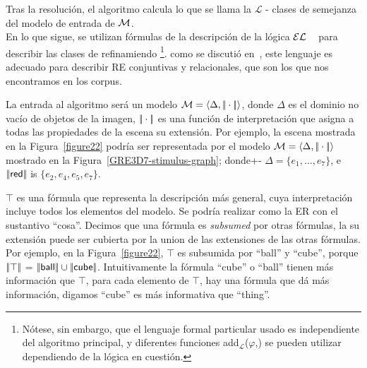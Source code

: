 

Tras la resoluci\'on, el algoritmo calcula lo que se llama la
$\mathcal{L}$ - clases de semejanza del modelo de entrada de $\mathcal{M}$.\\


En lo que sigue, se utilizan f\'ormulas de la descripci\'on de la l\'ogica $\mathcal{EL}$
~\cite{baad:desc03} para describir las clases de refinamiendo
\footnote{N\'otese, sin embargo, que el lenguaje formal particular usado es
   independiente del algoritmo principal, y diferentes funciones
  add$_{\mathcal{L}}$($\varphi$,\RE) se pueden utilizar dependiendo
   de la l\'ogica en cuesti\'on.}. como se discuti\'o 
en~\cite{arec2:2008:Areces}, 
este lenguaje es adecuado para describir
RE conjuntivas y relacionales, que son los que nos encontramos en los corpus.

  La entrada al algoritmo ser\'a un modelo $\mathcal{M} =
 \langle \Delta, |\!|\cdot|\!| \rangle$, donde $\Delta$ es el dominio no vac\'io de objetos de la imagen,
 $|\!|\cdot|\!|$ es una funci\'on de interpretaci\'on que asigna a todas las propiedades de la escena su extensi\'on.
 Por ejemplo, la escena mostrada en la Figura~\ref{figure22} podr\'ia ser representada por el modelo
 $\mathcal{M}=\langle \Delta,|\!|\cdot|\!| \rangle$ mostrado en la 
 Figura~\ref{GRE3D7-stimulus-graph}; donde+- $\Delta =
 \{e_1,\ldots,e_7\}$, e $|\!|\textsf{red}|\!|$ is $\{e_2, e_4, e_5,
 e_7\}$.

$\top$ es una f\'ormula que representa la descripci\'on m\'as general, cuya
interpretaci\'on incluye todos los elementos del modelo. Se podr\'ia realizar
como la ER con el sustantivo
``\textsf{cosa}''. Decimos que una f\'ormula es
\emph{subsumed} por otras f\'ormulas, la su extensi\'on puede ser cubierta por la
union de las extensiones de las otras f\'ormulas. Por ejemplo, en la
Figura~\ref{figure22}, $\top$ es subsumida por ``\textsf{ball}'' y
``\textsf{cube}'', porque $|\!|\top|\!|$ = $|\!|\textsf{ball}|\!|
\cup |\!|\textsf{cube}|\!|$.
Intuitivamente la f\'ormula ``\textsf{cube}'' o ``\textsf{ball}'' tienen m\'as informaci\'on que $\top$, para cada elemento de $\top$, hay una f\'ormula que d\'a m\'as informaci\'on, digamos ``\textsf{cube}'' es m\'as informativa que ``\textsf{thing}''.\\

